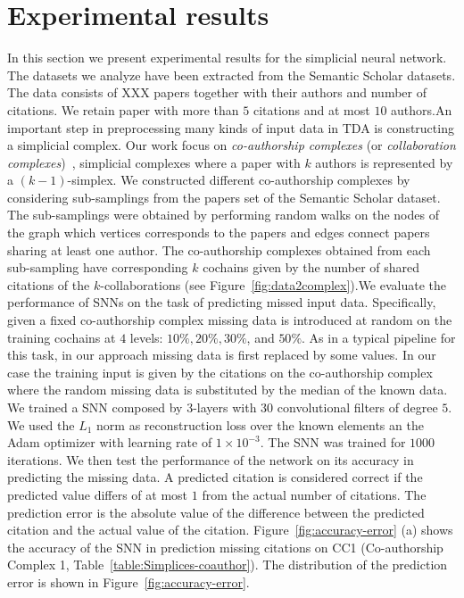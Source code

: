 \section{Experimental results}
In this section we present experimental results for the simplicial neural network. The datasets we analyze have been extracted from the Semantic Scholar datasets. The data consists of XXX papers together with their authors and number of citations. We retain paper with more than $5$ citations and at most $10$ authors.An important step in preprocessing many kinds of input data in TDA is constructing a simplicial complex. Our work focus on \emph{co-authorship complexes} (or \emph{collaboration complexes})~\cite{patania2017}, simplicial complexes where a paper with $k$ authors is represented by a $(k-1)$-simplex. We constructed different co-authorship complexes by considering sub-samplings from the papers set of the Semantic Scholar dataset. The sub-samplings were obtained by performing random walks on the nodes of the graph which vertices corresponds to the papers and edges connect papers sharing at least one author. The co-authorship complexes obtained from each sub-sampling  have corresponding $k$ cochains given by the number of shared citations of the $k$-collaborations (see Figure~\ref{fig:data2complex}).We evaluate the performance of SNNs on the task of predicting missed input data. Specifically, given a fixed co-authorship complex missing data is introduced 
at random on the training cochains at $4$ levels: $10\%,  20\%,  30\%$, and $50\% $.   As in a typical pipeline for this task, in our approach missing data is first replaced by some values. In our case the training input is given by the citations on the co-authorship complex where the random missing data is substituted by the median of the known data. We trained a SNN composed by $3$-layers with $30$ convolutional filters of degree $5$. We used the $L_1$ norm as reconstruction loss over the known elements an the Adam optimizer with learning rate of $1\times 10^{-3}$. The SNN was trained for $1000$ iterations. We then test the performance of the network on its accuracy in predicting the missing data. A predicted citation is considered correct if the predicted value differs of at most $1$ from the actual number of citations. The prediction error is the absolute value of the difference between the predicted citation and the actual value of the citation. Figure~\ref{fig:accuracy-error} (a) shows the accuracy of the SNN in prediction missing citations on CC1 (Co-authorship Complex 1, Table~\ref{table:Simplices-coauthor}). The distribution of the prediction error is shown in Figure~\ref{fig:accuracy-error}. 
